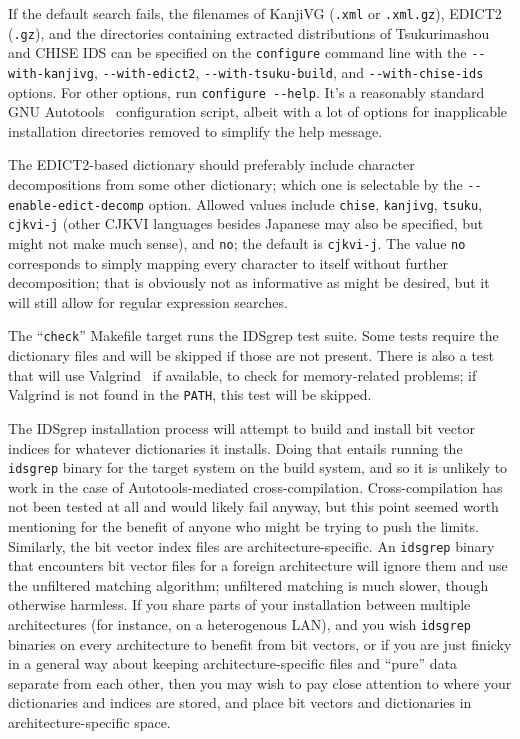 \documentclass[twocolumn]{report}
\newcommand{\DangerousBend}{\marginpar{\large\hfill\dbend\hfill\null}}
\begin{document}
If the default search fails, the filenames of KanjiVG (\texttt{.xml} or
\texttt{.xml.gz}), EDICT2 (\texttt{.gz}), and the directories containing
extracted distributions of Tsukurimashou and CHISE IDS can be
specified on the \texttt{configure} command line with
the \texttt{-{}-with-kanjivg}, \texttt{-{}-with-edict2},
\texttt{-{}-with-tsuku-build}, and \texttt{-{}-with-chise-ids} options.  For
other options, run \texttt{configure -{}-help}.  It's a reasonably standard
GNU Autotools~\cite{Autotools} configuration script, albeit with a lot of
options for inapplicable installation directories removed to simplify the
help message.

The EDICT2-based dictionary should preferably include
character decompositions from some other dictionary; which one is
selectable by the \texttt{-{}-enable-edict-decomp} option.  Allowed values
include \texttt{chise}, \texttt{kanjivg}, \texttt{tsuku}, \texttt{cjkvi-j}
(other CJKVI languages besides Japanese may also be specified, but might not
make much sense), and \texttt{no};
the default is \texttt{cjkvi-j}.
The value \texttt{no} corresponds to simply mapping every
character to itself without further decomposition; that is obviously not as
informative as might be desired, but it will still allow for regular
expression searches.

The ``\texttt{check}'' Makefile target runs the IDSgrep test suite.  Some
tests require the dictionary files and will be skipped if those are not
present.  There is also a test that will use Valgrind~\cite{Valgrind} if
available, to check for memory-related problems; if Valgrind is not found in
the \texttt{PATH}, this test will be skipped.

The \DangerousBend IDSgrep installation process will attempt to build and
install bit vector indices for whatever dictionaries it installs.  Doing
that entails running the \texttt{idsgrep} binary for the target system on
the build system, and so it is unlikely to work in the case of
Autotools-mediated cross-compilation.  Cross-compilation has not been tested
at all and would likely fail anyway, but this point seemed worth mentioning
for the benefit of anyone who might be trying to push the limits. 
Similarly, the bit vector index files are architecture-specific.  An
\texttt{idsgrep} binary that encounters bit vector files for a foreign
architecture will ignore them and use the unfiltered matching algorithm;
unfiltered matching is much slower, though otherwise harmless.  If you share
parts of your installation between multiple architectures (for instance, on
a heterogenous LAN), and you wish \texttt{idsgrep} binaries on every
architecture to benefit from bit vectors, or if you are just finicky in a
general way about keeping architecture-specific files and ``pure'' data
separate from each other, then you may wish to pay close attention to where
your dictionaries and indices are stored, and place bit vectors and
dictionaries in architecture-specific space.
\end{document}
